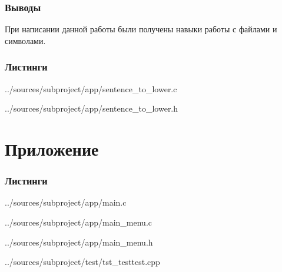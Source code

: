 \documentclass[12pt,a4paper]{report}
\begin{document}
\subsection{Выводы}
При написании данной работы были получены навыки работы с файлами и символами.
\subsection*{Листинги}


{../sources/subproject/app/sentence_to_lower.c}


{../sources/subproject/app/sentence_to_lower.h}
\chapter{Приложение}
\subsection*{Листинги}


{../sources/subproject/app/main.c}


{../sources/subproject/app/main_menu.c}


{../sources/subproject/app/main_menu.h}


{../sources/subproject/test/tst_testtest.cpp}
\end{document}
